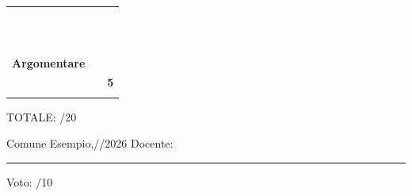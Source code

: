 \begin{tabularx}{\textwidth}{|c|>{\arraybackslash}m{11.6cm}|>{\centering\arraybackslash}m{0.8cm}|}
\multirow{4}{*}{\parbox{3,5cm}{ \textbf{\\\\\\Argomentare}\vspace{0.5cm}\\ \fontsize{9}{2}}}
& \fontsize{8.5}{2}\selectfont{\textbf{Non argomenta} la strategia/procedura risolutiva.} & 1 \\
\cline{2-3}
& \fontsize{8.5}{2}\selectfont{\textbf{Non argomenta} o, per lo più, argomenta in modo \textbf{errato} la strategia/procedura risolutiva utilizzando un linguaggio matematico \textbf{non appropriato o molto impreciso}.} & 2 \\
\cline{2-3}
& \fontsize{8.5}{2}\selectfont{Argomenta in maniera \textbf{frammentaria e/o non sempre coerente} la strategia/procedura esecutiva. Utilizza un linguaggio matematico \textbf{per lo più appropriato}, ma \textbf{non sempre rigoroso}.} & 3 \\
\cline{2-3}
& \fontsize{8.5}{2}\selectfont{Argomenta in modo \textbf{coerente ma incompleto} la procedura esecutiva. Utilizza un linguaggio matematico \textbf{pertinente ma con qualche incertezza}.} & 4 \\
\cline{2-3}
& \fontsize{8.5}{2}\selectfont{Argomenta in modo \textbf{coerente, preciso ed esaustivo} le strategie adottate. Mostra una \textbf{buona padronanza} nell'utilizzo del linguaggio scientifico.} & \textbf{5} \\
\Xhline{2pt}
\end{tabularx}


\vspace{0.2cm}
\hspace{14.2cm} TOTALE: \hspace{1cm}/20
\vspace{0.5cm}

Comune Esempio,\raisebox{-1mm}{\rule{1cm}{0.4pt}}/\raisebox{-1mm}{\rule{1cm}{0.4pt}}/2026
\hspace{0.5cm} Docente:\rule{5cm}{0.4pt}
\hspace{2.1cm} Voto: \hspace{1.7cm}/10